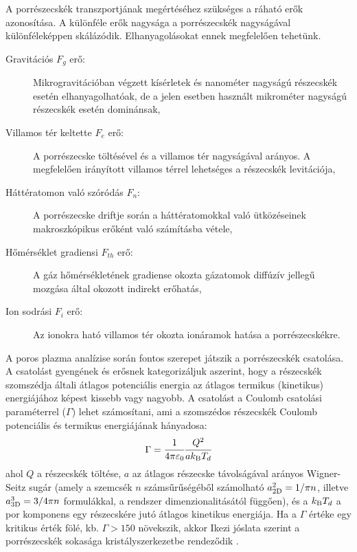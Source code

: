 	A porrészecskék transzportjának megértéséhez szükséges a ráható erők azonosítása.
	A különféle erők nagysága a porrészecskék nagyságával különféleképpen skálázódik. Elhanyagolásokat
	ennek megfelelően tehetünk.
	\begin{description}
		\item[Gravitációs $F_g$ erő:] Mikrogravitációban végzett kísérletek és nanométer nagyságú részecskék esetén
			elhanyagolhatóak, de a jelen esetben használt mikrométer nagyságú részecskék esetén dominánsak,
		\item[Villamos tér keltette $F_e$ erő:] A porrészecske töltésével és a villamos tér nagyságával
			arányos. A megfelelően irányított villamos térrel lehetséges a részecskék levitációja,  
		\item[Háttératomon való szóródás $F_n$:] A porrészecske driftje során a háttératomokkal való
			ütközéseinek makroszkópikus erőként való számításba vétele,
		\item[Hőmérséklet gradiensi $F_{th}$ erő:] A gáz hőmérsékletének gradiense okozta
			gázatomok diffúzív jellegű mozgása által okozott indirekt erőhatás,
		\item[Ion sodrási $F_i$ erő:] Az ionokra ható villamos
                  tér okozta ionáramok hatása a
			porrészecskékre.
	\end{description}
	A poros plazma analízise során fontos szerepet játszik a porrészecskék csatolása.
	A csatolást gyengének és erősnek kategorizáljuk aszerint, hogy a részecskék szomszédja általi
	átlagos potenciális energia az átlagos termikus (kinetikus) energiájához képest kissebb vagy
	nagyobb.
	A csatolást a Coulomb csatolási paraméterrel ($\Gamma$) lehet számosítani, ami a szomszédos
	részecskék Coulomb potenciális és termikus energiájának hányadosa:
	\begin{equation}
		\Gamma = \cfrac{1}{4\pi\varepsilon_0}
                \cfrac{Q^2}{ak_{\rm B}T_d} 
	\end{equation}
	ahol $Q$ a részecskék töltése, $a$ az átlagos részecske
        távolságával arányos Wigner-Seitz sugár (amely a
          szemcsék $n$ számsűrűségéből számolható $a^2_{\rm 2D}=1/\pi n$,
          illetve $a^3_{\rm 3D}=3/4\pi n$ formulákkal, a rendszer
          dimenzionalitásától függően), és a $k_{\rm B}T_d$ a por
        komponens egy részecskére jutó átlagos kinetikus energiája.
	Ha a $\Gamma$ értéke egy kritikus érték fölé, kb. $\Gamma > 150$ növekszik, akkor
	Ikezi jóslata szerint a porrészecskék sokasága
        kristályszerkezetbe rendeződik \cite{Ikezi1986}.
	
